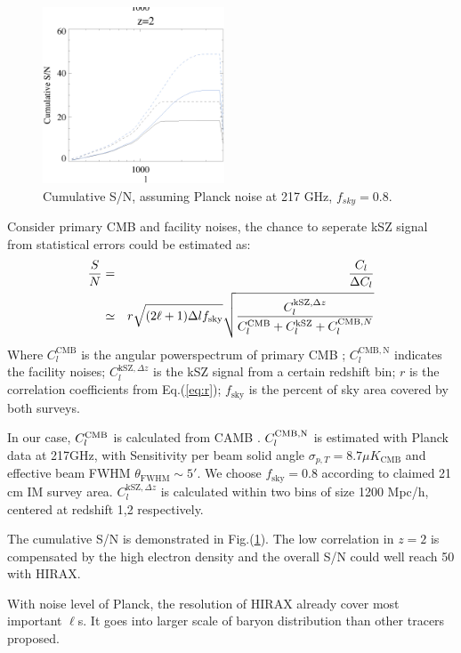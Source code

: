 \begin{figure}[tbp]
\begin{center}
\includegraphics[width=0.48\textwidth]{figure/sn_z1_z2.eps}
\end{center}
\vspace{-0.7cm}
\caption{Cumulative S/N, assuming Planck noise at 217 GHz, $f_{sky}=0.8$. 
}
\label{fig:sn}
\end{figure}
Consider primary CMB and facility noises, 
the chance to seperate kSZ signal from statistical errors could be estimated 
as:
\begin{eqnarray}
    \frac{S}{N}&=&\frac{C_l}{\Delta C_l}\\\nonumber
               &\simeq&
    r\sqrt{(2\ell+1)\Delta l f_\mathrm{sky}}\sqrt{\frac{C_l^{\mathrm{kSZ},\Delta z}}{C_l^{\mathrm{CMB}}+C_l^\mathrm{kSZ}+C_l^{\mathrm{CMB},N}}}
\end{eqnarray}
Where $C_l^\mathrm{CMB}$ is the angular powerspectrum of primary CMB 
;
$C_l^\mathrm{CMB,N}$ indicates the facility noises; 
$C_l^{\mathrm{kSZ},\Delta z}$ is the kSZ signal from a certain redshift bin; 
$r$ is the correlation coefficients from Eq.(\ref{eq:r}); 
$f_\mathrm{sky}$ is the percent of sky area covered by both surveys.

In our case, $C_l^\mathrm{CMB}$ is calculated from CAMB \cite{CAMB}. 
$C_l^\mathrm{CMB,N}$ is estimated with Planck data \cite{Planck2015} at 217GHz, with 
Sensitivity per beam solid angle $\sigma_{p,T}=8.7\mu K_\mathrm{CMB}$  
and effective beam FWHM $\theta_\mathrm{FWHM}\sim 5'$. 
We choose $f_\mathrm{sky}=0.8$ according to claimed 21 cm IM survey area. 
$C_l^{\mathrm{kSZ},\Delta z}$ is calculated within two bins of size 1200 Mpc/h, centered at redshift 1,2 respectively.

The cumulative S/N is demonstrated in Fig.(\ref{fig:sn}). 
The low correlation in $z=2$ is compensated by the high electron density 
and the overall S/N could well reach 50 with HIRAX.

With noise level of Planck, 
the resolution of HIRAX already cover most important $\ell$s. 
It goes into larger scale of baryon distribution than 
other tracers proposed. 
